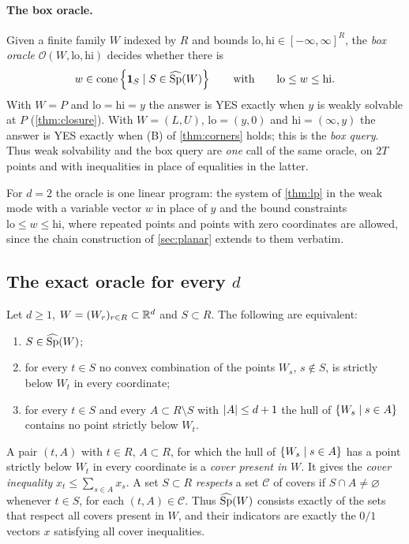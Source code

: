 \paragraph{The box oracle.} Given a finite family $W$ indexed by $R$ and bounds $\mathrm{lo},\mathrm{hi}\in[-\infty,\infty]^R$, the \emph{box oracle} $\mathcal O(W,\mathrm{lo},\mathrm{hi})$ decides whether there is
\[
w\in\operatorname{cone}\left\{ \mathbf 1_{S}\mid S\in\widehat{\operatorname{Sp}}(W) \right\}\qquad\text{with}\qquad \mathrm{lo}\le w\le\mathrm{hi}.
\]
With $W=P$ and $\mathrm{lo}=\mathrm{hi}=y$ the answer is YES exactly when $y$ is weakly solvable at $P$ (\cref{thm:closure}). With $W=(L,U)$, $\mathrm{lo}=(y,0)$ and $\mathrm{hi}=(\infty,y)$ the answer is YES exactly when (B) of \cref{thm:corners} holds; this is the \emph{box query}. Thus weak solvability and the box query are \emph{one} call of the same oracle, on $2T$ points and with inequalities in place of equalities in the latter.

\begin{remark}[$d=2$]\label{rem:oracle-planar}
For $d=2$ the oracle is one linear program: the system of \cref{thm:lp} in the weak mode with a variable vector $w$ in place of $y$ and the bound constraints $\mathrm{lo}\le w\le\mathrm{hi}$, where repeated points and points with zero coordinates are allowed, since the chain construction of \cref{sec:planar} extends to them verbatim.
\end{remark}

\subsection{The exact oracle for every $d$}

\begin{lemma}\label{lem:cover}
Let $d\ge1$, $W=(W_r)_{r\in R}\subset\mathbb{R}^d$ and $S\subset R$. The following are equivalent:
\begin{enumerate}[label=(\roman*)]
\item $S\in\widehat{\operatorname{Sp}}(W)$;
\item for every $t\in S$ no convex combination of the points $W_s$, $s\notin S$, is strictly below $W_t$ in every coordinate;
\item for every $t\in S$ and every $A\subset R\setminus S$ with $\left\lvert A \right\rvert\le d+1$ the hull of $\left\{ W_s\mid s\in A \right\}$ contains no point strictly below $W_t$.
\end{enumerate}
A pair $(t,A)$ with $t\in R$, $A\subset R$, for which the hull of $\left\{ W_s\mid s\in A \right\}$ has a point strictly below $W_t$ in every coordinate is a \emph{cover present in $W$}. It gives the \emph{cover inequality} $x_t\le\sum_{s\in A}x_s$. A set $S\subset R$ \emph{respects} a set $\mathcal C$ of covers if $S\cap A\ne\varnothing$ whenever $t\in S$, for each $(t,A)\in\mathcal C$. Thus $\widehat{\operatorname{Sp}}(W)$ consists exactly of the sets that respect all covers present in $W$, and their indicators are exactly the $0/1$ vectors $x$ satisfying all cover inequalities.
\end{lemma}

